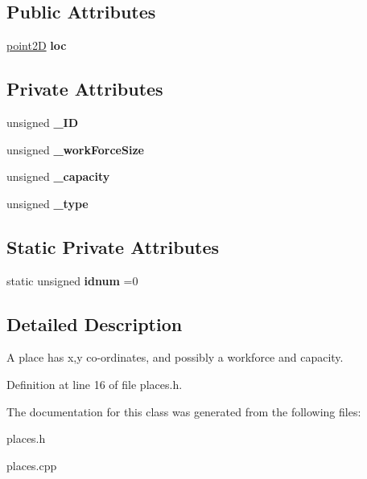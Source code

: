 \subsection*{Public Attributes}
\begin{DoxyCompactItemize}
\item 
\mbox{\label{classplace_a30abc26da34316006bac7d17398f0076}} 
\mbox{\hyperlink{classpoint2D}{point2D}} {\bfseries loc}
\end{DoxyCompactItemize}
\subsection*{Private Attributes}
\begin{DoxyCompactItemize}
\item 
\mbox{\label{classplace_a905b649d1f98547cc33d49226f4e56e1}} 
unsigned {\bfseries \+\_\+\+ID}
\item 
\mbox{\label{classplace_a675f8c9a2bd0c57ac1aaf0364cd63411}} 
unsigned {\bfseries \+\_\+work\+Force\+Size}
\item 
\mbox{\label{classplace_ac74e8a9d1409cec4421a038885012a8b}} 
unsigned {\bfseries \+\_\+capacity}
\item 
\mbox{\label{classplace_a4289f32750fe9e9b0632afe207dd999b}} 
unsigned {\bfseries \+\_\+type}
\end{DoxyCompactItemize}
\subsection*{Static Private Attributes}
\begin{DoxyCompactItemize}
\item 
\mbox{\label{classplace_af35d12619e41bd59aa91db9977fc8dc9}} 
static unsigned {\bfseries idnum} =0
\end{DoxyCompactItemize}


\subsection{Detailed Description}
A place has x,y co-\/ordinates, and possibly a workforce and capacity. 

Definition at line 16 of file places.\+h.



The documentation for this class was generated from the following files\+:\begin{DoxyCompactItemize}
\item 
places.\+h\item 
places.\+cpp\end{DoxyCompactItemize}
